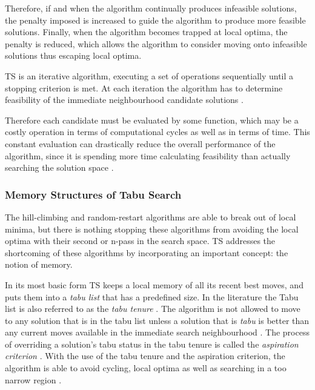 Therefore, if and when the algorithm continually produces infeasible solutions, the penalty imposed is increased to guide the algorithm to produce more feasible solutions. Finally, when the algorithm becomes trapped at local optima, the penalty is reduced, which allows the algorithm to consider moving onto infeasible solutions thus escaping local optima.

TS is an iterative algorithm, executing a set of operations sequentially until a stopping criterion is met\cite{EvoParallelTabu,TabuVechicleRoutingWithTimeWindows}. At each iteration the algorithm has to determine feasibility of the immediate neighbourhood candidate solutions \cite{EvoParallelTabu,TabuVechicleRoutingWithTimeWindows}. 

Therefore each candidate must be evaluated by some function, which may be a costly operation in terms of computational cycles as well as in terms of time\cite{EvoParallelTabu,TabuVechicleRoutingWithTimeWindows}. This constant evaluation can drastically reduce the overall performance of the algorithm, since it is spending more time calculating feasibility than actually searching the solution space \cite{EvoParallelTabu,TabuVechicleRoutingWithTimeWindows}. 

\subsubsection{Memory Structures of Tabu Search}
The hill-climbing and random-restart algorithms are able to break out of local minima, but there is nothing stopping these algorithms from avoiding the local optima with their second or n-pass in the search space. \gls{TS} addresses the shortcoming of these algorithms by incorporating an important concept: the notion of memory.

In its most basic form \gls{TS} keeps a local memory of all its recent best moves, and puts them into a \emph{tabu list} that has a predefined size. In the literature the Tabu list is also referred to as the \emph{tabu tenure} \cite{TSHazardous,TabuCarryOver}. The algorithm is not allowed to move to any solution that is in the tabu list unless a solution that is \emph{tabu} is better than any current moves available in the immediate search neighbourhood \cite{TabuCarryOver,ReactiveTabuVHR}. The process of overriding a solution's tabu status in the tabu tenure is called the \emph{aspiration criterion} \cite{TSHazardous,TabuCarryOver}. With the use of the tabu tenure and the aspiration criterion, the algorithm is able to avoid cycling, local optima as well as searching in a too narrow region \cite{TabuSingleMachineScheduling,CircuitTabu}.

